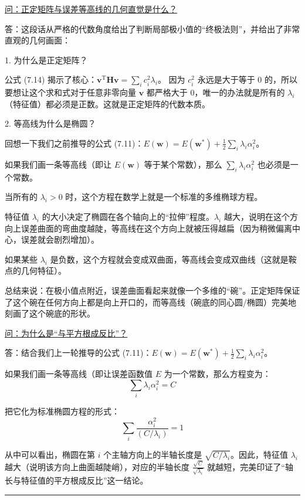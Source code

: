\documentclass{article}
\begin{document}
{\color{blue}
\underline{问：正定矩阵与误差等高线的几何直觉是什么？}

答：这段话从严格的代数角度给出了判断局部极小值的“终极法则”，并给出了非常直观的几何画面：

1. 为什么是正定矩阵？

公式 (7.14) 揭示了核心：$\mathbf{v}^\mathrm{T} \mathbf{H} \mathbf{v} = \sum_i c_i^2 \lambda_i$。
因为 $c_i^2$ 永远是大于等于 0 的，所以要想让这个求和式对于任意非零向量 $\mathbf{v}$ 都严格大于 0，唯一的办法就是所有的 $\lambda_i$（特征值）都必须是正数。这就是正定矩阵的代数本质。

2. 等高线为什么是椭圆？

回想一下我们之前推导的公式 (7.11)：$E(\mathbf{w}) = E(\mathbf{w}^*) + \frac{1}{2} \sum_i \lambda_i \alpha_i^2$。

如果我们画一条等高线（即让 $E(\mathbf{w})$ 等于某个常数），那么 $\sum_i \lambda_i \alpha_i^2$ 也必须是一个常数。

当所有的 $\lambda_i > 0$ 时，这个方程在数学上就是一个标准的多维椭球方程。

特征值 $\lambda_i$ 的大小决定了椭圆在各个轴向上的“拉伸”程度。$\lambda_i$ 越大，说明在这个方向上误差曲面的弯曲度越陡，等高线在这个方向上就被压得越扁（因为稍微偏离中心，误差就会剧烈增加）。

如果某些 $\lambda_i$ 是负数，这个方程就会变成双曲面，等高线会变成双曲线（这就是鞍点的几何特征）。

总结来说：在极小值点附近，误差曲面看起来就像一个多维的“碗”。正定矩阵保证了这个碗在任何方向上都是向上开口的，而等高线（碗底的同心圆/椭圆）完美地刻画了这个碗底的形状。

\underline{问：为什么是“与平方根成反比”？}

答：结合我们上一轮推导的公式 (7.11)：$E(\mathbf{w}) = E(\mathbf{w}^*) + \frac{1}{2} \sum_i \lambda_i \alpha_i^2$。

如果我们画一条等高线（即让误差函数值 $E$ 为一个常数，那么方程变为：
$$\sum_i \lambda_i \alpha_i^2 = C$$

把它化为标准椭圆方程的形式：
$$\sum_i \frac{\alpha_i^2}{(C / \lambda_i)} = 1$$

从中可以看出，椭圆在第 $i$ 个主轴方向上的半轴长度是 $\sqrt{C / \lambda_i}$。因此，特征值 $\lambda_i$ 越大（说明该方向上曲面越陡峭），对应的半轴长度 $\frac{\sqrt{C}}{\sqrt{\lambda_i}}$ 就越短，完美印证了“轴长与特征值的平方根成反比”这一结论。

}

\noindent\rule{\linewidth}{0.4pt}
 
\end{document}
